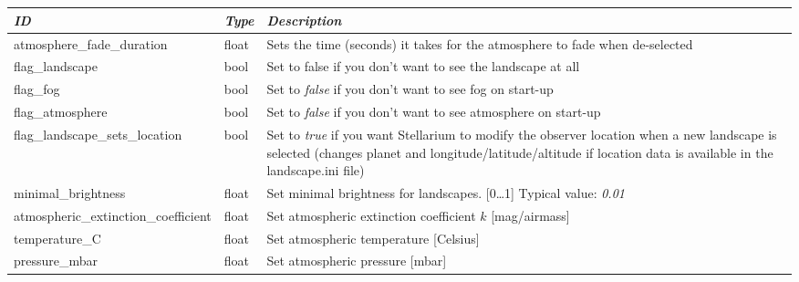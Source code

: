 \section{}\label{sec:config.ini:landscape}

\begin{longtabu} to \textwidth {l|l|X}\toprule
\emph{ID} & \emph{Type} & \emph{Description}\\\midrule
atmosphere\_fade\_duration      & float & Sets the time (seconds) it takes for the atmosphere to fade when de-selected\\\midrule
flag\_landscape                 & bool & Set to false if you don't want to see the landscape at all\\\midrule
flag\_fog                       & bool & Set to \emph{false} if you don't want to see fog on start-up\\\midrule
flag\_atmosphere                & bool & Set to \emph{false} if you don't want to see atmosphere on start-up\\\midrule
flag\_landscape\_sets\_location & bool & Set to \emph{true} if you want Stellarium to modify the observer location 
                                         when a new landscape is selected (changes planet and longitude/latitude/altitude 
                                         if location data is available in the landscape.ini file)\\\midrule
minimal\_brightness                  & float & Set minimal brightness for landscapes. [0\ldots1] Typical value: \emph{0.01}\\\midrule
atmospheric\_extinction\_coefficient & float & Set atmospheric extinction coefficient $k$ [mag/airmass]\\\midrule
temperature\_C                       & float & Set atmospheric temperature [Celsius]\\\midrule
pressure\_mbar                       & float & Set atmospheric pressure [mbar]\\\bottomrule
\end{longtabu}

\section{}\label{sec:config.ini:localization}

